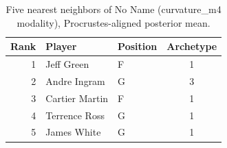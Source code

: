 \begin{table}[htbp]
  \centering\small
  \begin{tabular}{rllc}
    \toprule
    Rank & Player & Position & Archetype \\
    \midrule
    1 & Jeff Green & F & 1 \\
    2 & Andre Ingram & G & 3 \\
    3 & Cartier Martin & F & 1 \\
    4 & Terrence Ross & G & 1 \\
    5 & James White & G & 1 \\
    \bottomrule
  \end{tabular}
  \caption{Five nearest neighbors of No Name (curvature_m4 modality), Procrustes-aligned posterior mean.}
  \label{tab:No_Name_neighbors_curvature_m4}
\end{table}


